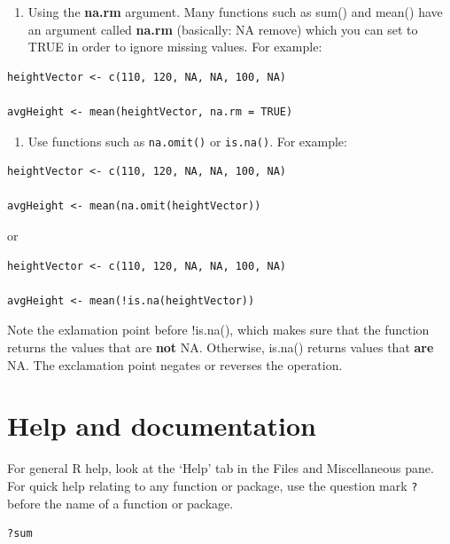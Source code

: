 \documentclass[]{book}
\providecommand{\tightlist}{%
  \setlength{\itemsep}{0pt}\setlength{\parskip}{0pt}}
\begin{document}
\begin{enumerate}
\def\labelenumi{\arabic{enumi}.}
\tightlist
\item
  Using the \textbf{na.rm} argument. Many functions such as sum() and mean() have an argument called \textbf{na.rm} (basically: NA remove) which you can set to TRUE in order to ignore missing values. For example:
\end{enumerate}

\begin{verbatim}
heightVector <- c(110, 120, NA, NA, 100, NA)

avgHeight <- mean(heightVector, na.rm = TRUE)
\end{verbatim}

\begin{enumerate}
\def\labelenumi{\arabic{enumi}.}
\setcounter{enumi}{1}
\tightlist
\item
  Use functions such as \texttt{na.omit()} or \texttt{is.na()}. For example:
\end{enumerate}

\begin{verbatim}
heightVector <- c(110, 120, NA, NA, 100, NA)

avgHeight <- mean(na.omit(heightVector))
\end{verbatim}

or

\begin{verbatim}
heightVector <- c(110, 120, NA, NA, 100, NA)

avgHeight <- mean(!is.na(heightVector))
\end{verbatim}

Note the exlamation point before !is.na(), which makes sure that the function returns the values that are \textbf{not} NA. Otherwise, is.na() returns values that \textbf{are} NA. The exclamation point negates or reverses the operation.

\hypertarget{help-and-documentation}{%
\section{Help and documentation}\label{help-and-documentation}}

For general R help, look at the `Help' tab in the Files and Miscellaneous pane.
For quick help relating to any function or package, use the question mark \texttt{?} before the name of a function or package.

\begin{verbatim}
?sum
\end{verbatim}
\end{document}

